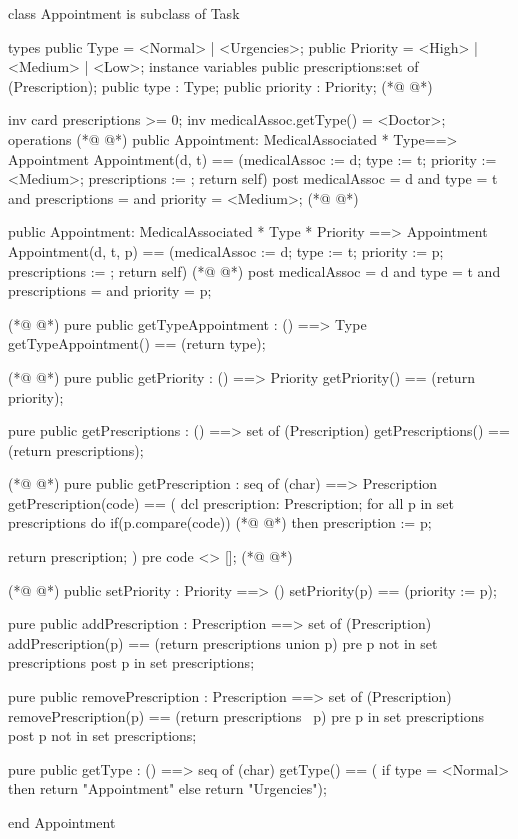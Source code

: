 \begin{vdmpp}[breaklines=true]
class Appointment is subclass of Task

types
 public Type = <Normal> | <Urgencies>;
 public Priority = <High> | <Medium> | <Low>;
instance variables
  public prescriptions:set of (Prescription);
  public type : Type;
  public priority : Priority;
(*@
\label{Appointment:10}
@*)
  
  inv card prescriptions >= 0;
  inv medicalAssoc.getType() = <Doctor>;
operations
(*@
\label{getDoctorAppointment:14}
@*)
 public Appointment: MedicalAssociated * Type==> Appointment
  Appointment(d, t) == (medicalAssoc := d; type := t; priority := <Medium>; prescriptions := {}; return self)
 post medicalAssoc = d and type = t and prescriptions = {} and priority = <Medium>;
(*@
\label{getPrescriptions:17}
@*)
 
 public Appointment: MedicalAssociated * Type * Priority ==> Appointment
  Appointment(d, t, p) == (medicalAssoc := d; type := t; priority := p; prescriptions := {}; return self)
(*@
\label{getPrescription:20}
@*)
 post medicalAssoc = d and type = t and prescriptions = {} and priority = p;
 
(*@
\label{getTypeAppointment:22}
@*)
 pure public getTypeAppointment : () ==> Type
  getTypeAppointment() == (return type);
  
(*@
\label{getPriority:25}
@*)
 pure public getPriority : () ==> Priority
  getPriority() == (return priority);
 
  pure public getPrescriptions : () ==> set of (Prescription)
   getPrescriptions() == (return prescriptions);
   
(*@
\label{addPrescription:31}
@*)
  pure public getPrescription : seq of (char) ==> Prescription
   getPrescription(code) == (
                dcl prescription: Prescription;
                 for all p in set prescriptions do
                  if(p.compare(code))
(*@
\label{removePrescription:36}
@*)
                   then prescription := p;
                 
                 return prescription;
                )
  pre code <> [];
(*@
\label{getType:41}
@*)
  
(*@
\label{setPriority:42}
@*)
  public setPriority : Priority ==> ()
   setPriority(p) == (priority := p);
  
  pure public addPrescription : Prescription ==> set of (Prescription)
   addPrescription(p) == (return prescriptions union {p})
  pre p not in set prescriptions
  post p in set prescriptions;
                 
 pure public removePrescription : Prescription ==> set of (Prescription)
   removePrescription(p) == (return prescriptions \ {p})
  pre p in set prescriptions
  post p not in set prescriptions;
  
 pure public getType : () ==> seq of (char) 
  getType() == (
          if type = <Normal> 
           then return "Appointment"
          else
           return "Urgencies");
   
end Appointment
\end{vdmpp}
